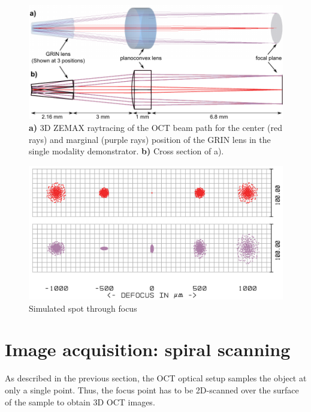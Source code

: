 \documentclass[10pt]{iopart}
\begin{document}
\begin{figure}[h!]\centering
      \includegraphics[width=\columnwidth]{figures/singleAll.pdf}
      \caption{\textbf{a)} 3D ZEMAX raytracing of the OCT beam path for the center (red rays) and marginal (purple rays) position of the GRIN lens in the single modality demonstrator.
      \textbf{b)} Cross section of a).}
      \label{fig:single}
\end{figure}


\begin{figure}[h!]\centering
      \includegraphics{figures/singleSpot.png}
      \caption{Simulated spot through focus}
      \label{fig:MTFcomp}
\end{figure}




\section{Image acquisition: spiral scanning}
\label{sec:spiralScanning}

As described in the previous section, the OCT optical setup samples the object at only a single point. Thus, the focus point has to be 2D-scanned over the surface of the sample to obtain 3D OCT images.
\end{document}
